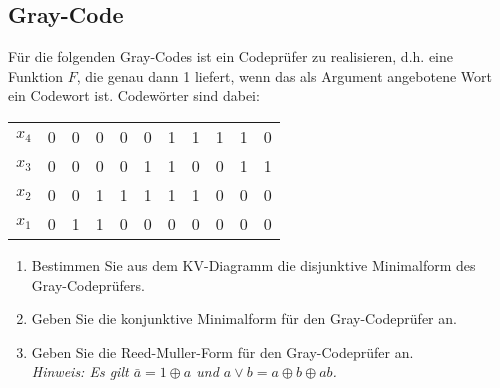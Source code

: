 \documentclass{exercisesheet}
\begin{document}
\subsection{Gray-Code}
Für die folgenden Gray-Codes ist ein Codeprüfer zu realisieren, d.h. eine Funktion $F$, die genau dann 1 liefert, wenn das als Argument angebotene Wort ein Codewort ist. Codewörter sind dabei:

\begin{center}
  \begin{tabular}{c|cccc cccc cc}
    $x_4$ & 0 & 0 & 0 & 0 & 0 & 1 & 1 & 1 & 1 & 0 \\
    $x_3$ & 0 & 0 & 0 & 0 & 1 & 1 & 0 & 0 & 1 & 1 \\
    $x_2$ & 0 & 0 & 1 & 1 & 1 & 1 & 1 & 0 & 0 & 0 \\
    $x_1$ & 0 & 1 & 1 & 0 & 0 & 0 & 0 & 0 & 0 & 0 \\
  \end{tabular}
\end{center}

\begin{enumerate}
  \item Bestimmen Sie aus dem KV-Diagramm die disjunktive Minimalform des Gray-Codeprüfers.
  \item Geben Sie die konjunktive Minimalform für den Gray-Codeprüfer an.
  \item Geben Sie die Reed-Muller-Form für den Gray-Codeprüfer an.\\\textit{Hinweis: Es gilt $\bar{a}=1\oplus a$ und $a\lor b = a\oplus b\oplus ab$.}
\end{enumerate}

\setcounter{subsection}{9}
\end{document}
